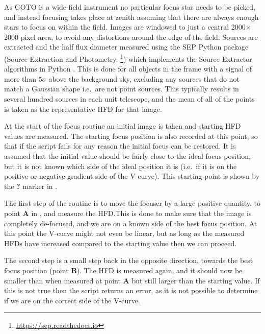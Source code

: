 \begin{colsection}
As GOTO is a wide-field instrument no particular focus star needs to be picked, and instead focusing takes place at zenith assuming that there are always enough stars to focus on within the field. Images are windowed to just a central 2000$\times$2000 pixel area, to avoid any distortions around the edge of the field. Sources are extracted and the half flux diameter measured using the SEP Python package (Source Extraction and Photometry, \footnote{\url{https://sep.readthedocs.io}}) which implements the Source Extractor algorithms in Python \citep{SE}. This is done for all objects in the frame with a signal of more than $5\sigma$ above the background sky, excluding any sources that do not match a Gaussian shape i.e.\ are not point sources. This typically results in several hundred sources in each unit telescope, and the mean of all of the points is taken as the representative HFD for that image.

At the start of the focus routine an initial image is taken and starting HFD values are measured. The starting focus position is also recorded at this point, so that if the script fails for any reason the initial focus can be restored. It is assumed that the initial value should be fairly close to the ideal focus position, but it is not known which side of the ideal position it is (i.e.\ if it is on the positive or negative gradient side of the V-curve). This starting point is shown by the \textbf{?} marker in .

The first step of the routine is to move the focuser by a large positive quantity, to point \textbf{A} in , and measure the HFD.\@ This is done to make sure that the image is completely de-focused, and we are on a known side of the best focus position. At this point the V-curve might not even be linear, but as long as the measured HFDs have increased compared to the starting value then we can proceed.

The second step is a small step back in the opposite direction, towards the best focus position (point \textbf{B}). The HFD is measured again, and it should now be smaller than when measured at point \textbf{A} but still larger than the starting value. If this is not true then the script returns an error, as it is not possible to determine if we are on the correct side of the V-curve.


\end{colsection}
